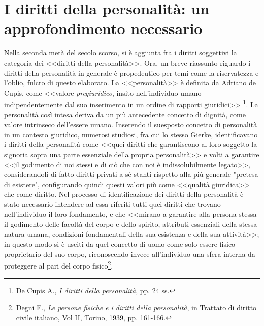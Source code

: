 
\section{I diritti della personalità: un approfondimento necessario}
Nella seconda metà del secolo scorso, si è aggiunta fra i diritti soggettivi la categoria dei <<diritti della personalità>>. 
Ora, un breve riassunto riguardo i diritti della personalità in generale è propedeutico per temi come la riservatezza e l'oblio, fulcro di questo elaborato.
La <<personalità>> è definita da Adriano de Cupis, come <<valore \textit{pregiuridico}, insito nell'individuo umano indipendentemente dal suo inserimento in un ordine di rapporti giuridici>>
\footnote{De Cupis A., \textit{I diritti della personalità}, pp. 24 ss.}. 
La personalità così intesa deriva da un più antecedente concetto di dignità, come valore intrinseco dell'essere umano.
Inserendo il suesposto concetto di personalità in un contesto giuridico, numerosi studiosi, fra cui lo stesso Gierke, identificavano i diritti della personalità come <<quei diritti che garantiscono al loro soggetto la signoria sopra una parte essenziale della propria personalità>> e volti a garantire <<il godimento di noi stessi e di ciò che con noi è indissolubilmente legato>>, considerandoli di fatto diritti privati a sé stanti rispetto alla più generale "pretesa di esistere", configurando quindi questi valori più come <<qualità giuridica>> che come diritto. Nel processo di identificazione dei diritti della personalità è stato necessario intendere ad essa riferiti tutti quei diritti che trovano nell'individuo il loro fondamento, e che <<mirano a garantire alla persona stessa il godimento delle facoltà del corpo e dello spirito, attributi essenziali della stessa natura umana, condizioni fondamentali della sua esistenza e della sua attività>>; in questo modo si è usciti da quel concetto di uomo come solo essere fisico proprietario del suo corpo, riconoscendo invece all'individuo una sfera interna da proteggere al pari del corpo fisico\footnote{Degni F., \textit{Le persone fisiche e i diritti della personalità}, in Trattato di diritto civile italiano, Vol II, Torino, 1939, pp. 161-166.}.

